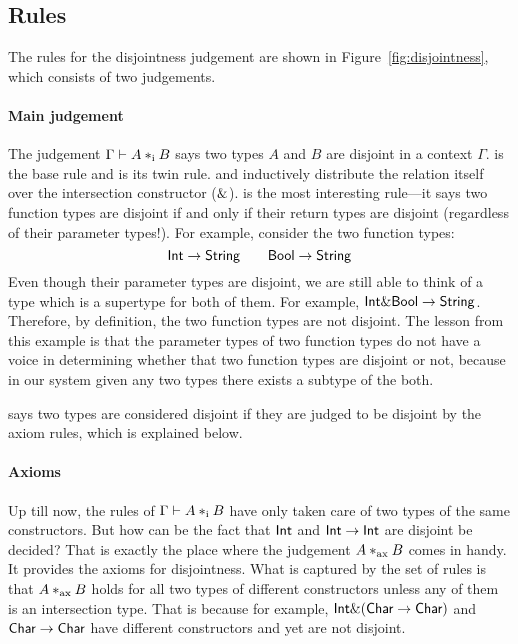 \subsection{Rules}

The rules for the disjointness judgement are shown in
Figure~\ref{fig:disjointness}, which consists of two judgements.

\paragraph{Main judgement} The judgement $\Gamma \vdash A *_\textnormal{i} B$ says two types
$A$ and $B$ are disjoint in a context $\Gamma$.  is the
base rule and  is its twin rule.
 and  inductively distribute
the relation itself over the intersection constructor ($\&$).
 is the most interesting rule---it says two function
types are disjoint if and only if their return types are disjoint (regardless of
their parameter types!). For example, consider the two function types:
\[ \textsf{Int} \to \textsf{String} \qquad \textsf{Bool} \to \textsf{String} \]
Even though their parameter types are disjoint, we are still able to think of a
type which is a supertype for both of them. For example, $ \textsf{Int} \& \textsf{Bool}
\to \textsf{String} $. Therefore, by definition, the two function types are not
disjoint. The lesson from this example is that the parameter types of two
function types do not have a voice in determining whether that two function
types are disjoint or not, because in our system given any two types there
exists a subtype of the both.

 says two types are considered disjoint if they are
judged to be disjoint by the axiom rules, which is explained below.

\paragraph{Axioms} Up till now, the rules of $ \Gamma \vdash A *_\textnormal{i} B $ have only
taken care of two types of the same constructors. But how can be the fact that
$\textsf{Int}$ and $\textsf{Int} \to \textsf{Int}$ are disjoint be decided? That is exactly the
place where the judgement $ A *_\textnormal{ax} B $ comes in handy. It provides the
axioms for disjointness. What is captured by the set of rules is that $ A
*_\textnormal{ax} B $ holds for all two types of different constructors unless any of
them is an intersection type. That is because for example, $ \textsf{Int} \&
(\textsf{Char} \to \textsf{Char}) $ and $ \textsf{Char} \to \textsf{Char} $ have different constructors
and yet are not disjoint. 

